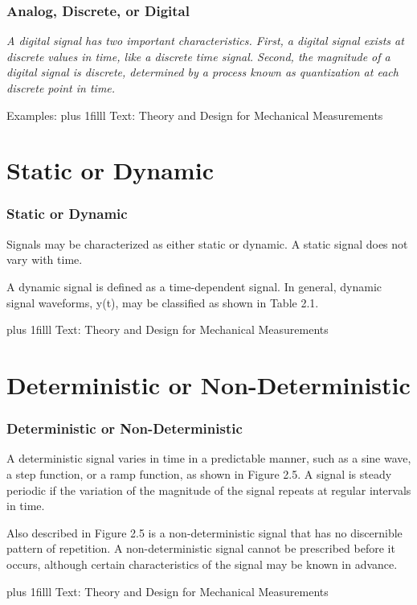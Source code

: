 \documentclass[fleqn]{beamer} %
\newcommand{\sectiontitleII}{Analog, Discrete, or Digital}
\newcommand{\sectiontitleIII}{Static or Dynamic}
\newcommand{\sectiontitleIV}{Deterministic or Non-Deterministic}
\newcommand{\btVFill}{\vskip0pt plus 1filll}
\begin{document}
	\begin{frame} \small
		\frametitle{\sectiontitleII}    
		\bigskip 
			{\it A {\BL digital} signal has two important characteristics. First, a digital signal
			exists at discrete values in time, like a discrete time signal. Second, the magnitude of a digital signal
			is discrete, determined by a process known as {\PR quantization} at each discrete point in time. }

		\vspace{30mm}
		Examples:
		\btVFill
		\tiny{Text: Theory and Design for Mechanical Measurements}	
	\end{frame}
	
\section{\sectiontitleIII}	
\begin{frame}[label=sectionIII] \small
\frametitle{\sectiontitleIII}
\bigskip

Signals may be characterized as either static or
dynamic. A static signal does not vary with time.

A dynamic signal is defined as a time-dependent signal. In general, dynamic signal waveforms,
y(t), may be classified as shown in Table 2.1.
	
\btVFill
\tiny{Text: Theory and Design for Mechanical Measurements}		
\end{frame}

\section{\sectiontitleIV}	
\begin{frame}[label=sectionIV] \small
\frametitle{\sectiontitleIV}
\bigskip

A deterministic signal varies in time in a predictable
manner, such as a sine wave, a step function, or a ramp function, as shown in Figure 2.5. A signal is
steady periodic if the variation of the magnitude of the signal repeats at regular intervals in time.

Also described in Figure 2.5 is a non-deterministic signal that has no discernible pattern of
repetition. A non-deterministic signal cannot be prescribed before it occurs, although certain characteristics of the signal may be known in advance.

\btVFill
\tiny{Text: Theory and Design for Mechanical Measurements}	
\end{frame}
\end{document}
